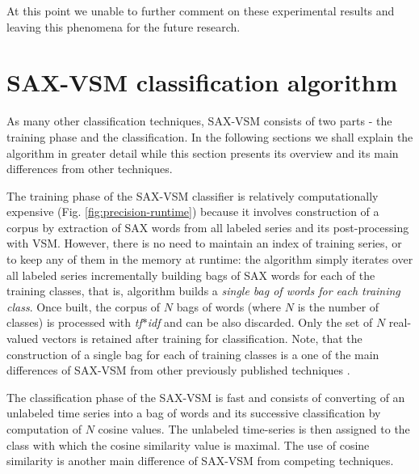 \documentclass{llncs}
\begin{document}
At this point we unable to further comment on these experimental results and 
leaving this phenomena for the future research.

\section{SAX-VSM classification algorithm }
As many other classification techniques, SAX-VSM consists of two parts - the training phase 
and the classification. In the following sections we shall explain the algorithm in greater detail 
while this section presents its overview and its main differences from other techniques.

The training phase of the SAX-VSM classifier is relatively computationally expensive 
(Fig. \ref{fig:precision-runtime}) because it involves construction of a corpus by
extraction of SAX words from all labeled series and its post-processing with VSM. 
However, there is no need to maintain an index of training series, or to keep any of 
them in the memory at runtime: the algorithm simply iterates over all labeled series
incrementally building bags of SAX words for each of the training classes, 
that is, algorithm builds a \textit{single bag of words for each training class}. 
Once built, the corpus of $N$ bags of words (where $N$ is the number of classes) is
processed with \textit{tf$\ast$idf} and can be also discarded. 
Only the set of $N$ real-valued vectors is retained after training for classification. 
Note, that the construction of a single bag for each of training classes is a one 
of the main differences of SAX-VSM from other previously published 
techniques \cite{bag_patterns}.

The classification phase of the SAX-VSM is fast and consists of converting of an 
unlabeled time series into a bag of words and its successive classification by 
computation of $N$ cosine values. The unlabeled time-series is then assigned to 
the class with which the cosine similarity value is maximal. The use of cosine 
similarity is another main difference of SAX-VSM from competing techniques.
\end{document}
